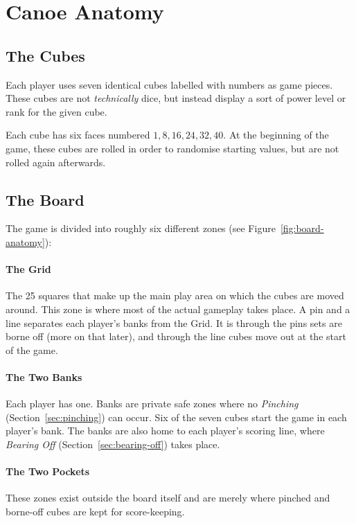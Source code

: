 \section{Canoe Anatomy}
\subsection{The Cubes}
Each player uses seven identical cubes labelled with numbers as game pieces.
These cubes are not \textit{technically} dice, but instead display a sort of power level or rank for the given cube.

Each cube has six faces numbered $1, 8, 16, 24, 32, 40$. 
At the beginning of the game, these cubes are rolled in order to randomise starting values, but are not rolled again afterwards.
\subsection{The Board}
The game is divided into roughly six different zones (see Figure~\ref{fig:board-anatomy}):
\paragraph{The Grid} The 25 squares that make up the main play area on which the cubes are moved around. 
This zone is where most of the actual gameplay takes place.
A pin and a line separates each player's banks from the Grid.
It is through the pins sets are borne off (more on that later), and through the line cubes move out at the start of the game.
\paragraph{The Two Banks} Each player has one. Banks are private safe zones where no \textit{Pinching} (Section~\ref{sec:pinching}) can occur. Six of the seven cubes start the game in each player's bank.
The banks are also home to each player's scoring line, where \textit{Bearing Off} (Section~\ref{sec:bearing-off}) takes place.
\paragraph{The Two Pockets} These zones exist outside the board itself and are merely where pinched and borne-off cubes are kept for score-keeping.
